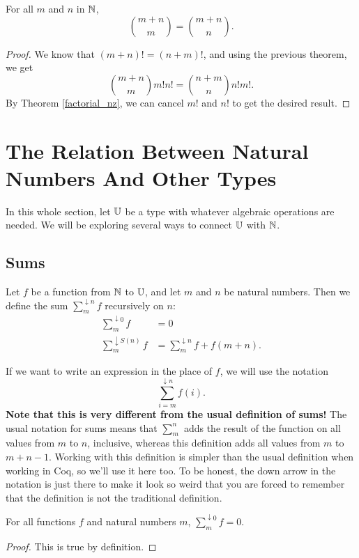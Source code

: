 \documentclass[../math.tex]{subfiles}
\begin{document}
\begin{theorem}
    For all $m$ and $n$ in $\mathbb{N}$,
    \[
        \binom{m + n}{m} = \binom{m + n}{n}.
    \]
\end{theorem}
\begin{proof}
    We know that $(m + n)! = (n + m)!$, and using the previous theorem, we get
    \[
        \binom{m + n}{m} m! n! = \binom{n + m}{n} n! m!.
    \]
    By Theorem \ref{factorial_nz}, we can cancel $m!$ and $n!$ to get the
    desired result.
\end{proof}

\section{The Relation Between Natural Numbers And Other Types}

In this whole section, let $\mathbb{U}$ be a type with whatever algebraic operations are
needed.  We will be exploring several ways to connect $\mathbb{U}$ with $\mathbb{N}$.

\subsection{Sums}

\begin{definition}
    Let $f$ be a function from $\mathbb{N}$ to $\mathbb{U}$, and let $m$ and $n$ be natural
    numbers.  Then we define the sum $\sum_m^{\downarrow n} f$ recursively on
    $n$:
    \begin{align*}
        \sum_m^{\downarrow 0}    f &= 0 \\
        \sum_m^{\downarrow S(n)} f &= \sum_m^{\downarrow n} f + f(m + n).
    \end{align*}
\end{definition}
If we want to write an expression in the place of $f$, we will use the notation
\[
    \sum_{i = m}^{\downarrow n} f(i).
\]
\textbf{Note that this is very different from the usual definition of sums!} The
usual notation for sums means that $\sum_m^n$ adds the result of the function on
all values from $m$ to $n$, inclusive, whereas this definition adds all values
from $m$ to $m + n - 1$.  Working with this definition is simpler than the usual
definition when working in Coq, so we'll use it here too.  To be honest, the
down arrow in the notation is just there to make it look so weird that you are
forced to remember that the definition is not the traditional definition.

\begin{theorem}
    For all functions $f$ and natural numbers $m$, $\sum_m^{\downarrow 0} f =
    0$.
\end{theorem}
\begin{proof}
    This is true by definition.
\end{proof}
\end{document}
